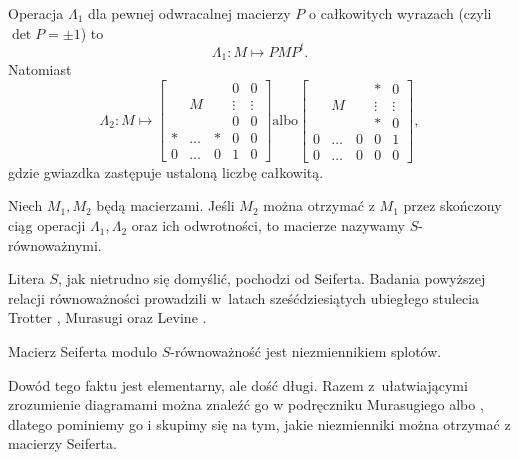 \begin{definition}
    Operacja $\Lambda_1$ dla pewnej odwracalnej macierzy $P$ o całkowitych wyrazach (czyli $\det P = \pm 1$) to
    \begin{equation}
        \Lambda_1 \colon M \mapsto PMP^t.
    \end{equation}
    Natomiast
    \begin{equation}
        \Lambda_2 \colon M \mapsto \begin{bmatrix}
  &   &  & 0 & 0 \\
  & M &  & \vdots & \vdots \\
  &   &  & 0 & 0 \\
* & \dots & * & 0 & 0 \\
0 & \dots & 0 & 1 & 0
\end{bmatrix} \textrm{albo} \begin{bmatrix}
  &   &  & * & 0 \\
  & M &  & \vdots & \vdots \\
  &   &  & * & 0 \\
0 & \dots & 0 & 0 & 1 \\
0 & \dots & 0 & 0 & 0
\end{bmatrix},
    \end{equation}
    gdzie gwiazdka zastępuje ustaloną liczbę całkowitą.
\end{definition}

\begin{definition}
    Niech $M_1, M_2$ będą macierzami.
    Jeśli $M_2$ można otrzymać z $M_1$ przez skończony ciąg operacji $\Lambda_1, \Lambda_2$ oraz ich odwrotności, to macierze nazywamy $S$-równoważnymi.
\end{definition}

Litera $S$, jak nietrudno się domyślić, pochodzi od Seiferta.
Badania powyższej relacji równoważności prowadzili w~latach sześćdziesiątych ubiegłego stulecia Trotter \cite{trotter62}, Murasugi \cite{murasugi65} oraz Levine \cite{levine70}.

\begin{proposition}
    Macierz Seiferta modulo $S$-równoważność jest niezmiennikiem splotów.
\end{proposition}


Dowód tego faktu jest elementarny, ale dość długi.
Razem z~ułatwiającymi zrozumienie diagramami można znaleźć go w podręczniku Murasugiego albo \cite[s. 64]{kawauchi96}, dlatego pominiemy go i skupimy się na tym, jakie niezmienniki można otrzymać z macierzy Seiferta.

